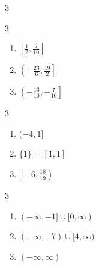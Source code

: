 \documentclass{ximera}
\begin{document}
\begin{multicols}{3}
\begin{enumerate}
\setcounter{enumi}{\value{HW}}

\item $(4, \infty)$
}

\item  $\left[ \frac{7}{2 - \sqrt[3]{18}}, \infty\right)$

\item   $[0, \infty)$\vphantom{$\left[ \frac{7}{2 - \sqrt[3]{18}}, \infty\right)$}


\setcounter{HW}{\value{enumi}}
\end{enumerate}
\end{multicols}


\begin{multicols}{3}
\begin{enumerate}
\setcounter{enumi}{\value{HW}}

\item $\left[ \frac{1}{2}, \frac{7}{10}\right]$
\item $\left(-\frac{23}{6}, \frac{19}{2} \right]$
\item $\left(-\frac{13}{10}, -\frac{7}{10} \right]$

\setcounter{HW}{\value{enumi}}
\end{enumerate}
\end{multicols}

\begin{multicols}{3}
\begin{enumerate}
\setcounter{enumi}{\value{HW}}
\item  $(-4,1]$

\item  $\{1 \} = [1,1]$ 

\item  $\left[-6, \frac{18}{19} \right)$

\setcounter{HW}{\value{enumi}}
\end{enumerate}
\end{multicols}


\begin{multicols}{3}
\begin{enumerate}
\setcounter{enumi}{\value{HW}}
\item  $(-\infty, -1] \cup [0, \infty)$ 
\item   $(-\infty, -7) \cup [4, \infty)$
\item   $(-\infty, \infty)$

\setcounter{HW}{\value{enumi}}
\end{enumerate}
\end{multicols}
\end{document}

